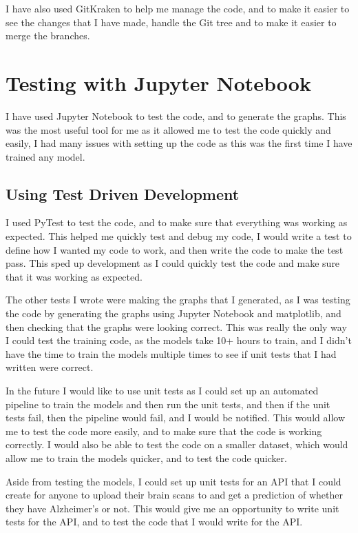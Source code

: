 \documentclass[]{final_report}
\begin{document}
I have also used GitKraken\cite{GitKraken} to help me manage the code, and to make it easier to see the changes that I have made, handle the Git tree and to make it easier to merge the branches.

\section{Testing with Jupyter Notebook}
I have used Jupyter Notebook to test the code, and to generate the graphs.
This was the most useful tool for me as it allowed me to test the code quickly and easily,
I had many issues with setting up the code as this was the first time I have trained any model.

\subsection{Using Test Driven Development}
I used PyTest\cite{PyTest} to test the code, and to make sure that everything was working as expected.
This helped me quickly test and debug my code, I would write a test to define how I wanted my code to work, and then write the code to make the test pass.
This sped up development as I could quickly test the code and make sure that it was working as expected.

The other tests I wrote were making the graphs that I generated, as I was testing the code by generating the graphs using Jupyter Notebook\cite{Jupyter} and matplotlib\cite{Matplotlib},
and then checking that the graphs were looking correct. This was really the only way I could test the training code, as the models take 10+ hours to train,
and I didn't have the time to train the models multiple times to see if unit tests that I had written were correct.

In the future I would like to use unit tests as I could set up an automated pipeline to train the models and then run the unit tests,
and then if the unit tests fail, then the pipeline would fail, and I would be notified. This would allow me to test the code more easily,
and to make sure that the code is working correctly. I would also be able to test the code on a smaller dataset, which would allow me to train the models quicker,
and to test the code quicker.

Aside from testing the models, I could set up unit tests for an API that I could create for anyone to upload their brain scans to and get a prediction of whether they have Alzheimer's or not.
This would give me an opportunity to write unit tests for the API, and to test the code that I would write for the API.
\end{document}
